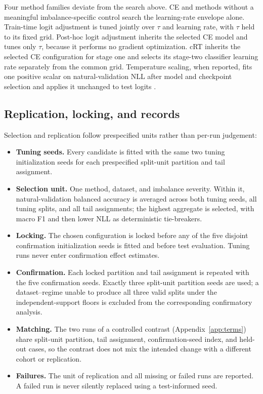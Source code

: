 \documentclass[11pt]{article}
\begin{document}
Four method families deviate from the search above. CE and methods without a meaningful imbalance-specific control search the learning-rate envelope alone. Train-time logit adjustment is tuned jointly over $\tau$ and learning rate, with $\tau$ held to its fixed grid. Post-hoc logit adjustment inherits the selected CE model and tunes only $\tau$, because it performs no gradient optimization. cRT inherits the selected CE configuration for stage one and selects its stage-two classifier learning rate separately from the common grid. Temperature scaling, when reported, fits one positive scalar on natural-validation NLL after model and checkpoint selection and applies it unchanged to test logits \citep{guo2017calibration}.

\subsection{Replication, locking, and records}
Selection and replication follow prespecified units rather than per-run judgement:
\begin{itemize}\setlength{\itemsep}{1pt}
  \item \textbf{Tuning seeds.} Every candidate is fitted with the same two tuning initialization seeds for each prespecified split-unit partition and tail assignment.
  \item \textbf{Selection unit.} One method, dataset, and imbalance severity. Within it, natural-validation balanced accuracy is averaged across both tuning seeds, all tuning splits, and all tail assignments; the highest aggregate is selected, with macro F1 and then lower NLL as deterministic tie-breakers.
  \item \textbf{Locking.} The chosen configuration is locked before any of the five disjoint confirmation initialization seeds is fitted and before test evaluation. Tuning runs never enter confirmation effect estimates.
  \item \textbf{Confirmation.} Each locked partition and tail assignment is repeated with the five confirmation seeds. Exactly three split-unit partition seeds are used; a dataset--regime unable to produce all three valid splits under the independent-support floors is excluded from the corresponding confirmatory analysis.
  \item \textbf{Matching.} The two runs of a controlled contrast (Appendix~\ref{app:terms}) share split-unit partition, tail assignment, confirmation-seed index, and held-out cases, so the contrast does not mix the intended change with a different cohort or replication.
  \item \textbf{Failures.} The unit of replication and all missing or failed runs are reported. A failed run is never silently replaced using a test-informed seed.
\end{itemize}
\end{document}
